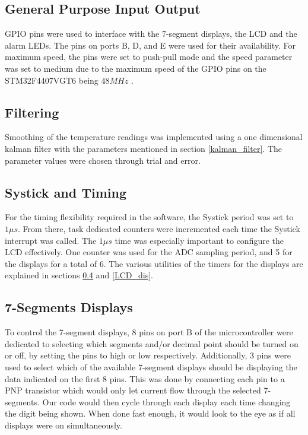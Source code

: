 \documentclass[12pt]{article}
\begin{document}
\subsection{General Purpose Input Output}
\FloatBarrier
GPIO pins were used to interface with the 7-segment displays, the LCD and the alarm LEDs. The pins on ports B, D, and E were used for their availability. For maximum speed, the pins were set to push-pull mode and the speed parameter was set to medium due to the maximum speed of the GPIO pins on the STM32F4407VGT6 being $48 MHz$ \cite{STM32F407xx}.

\subsection{Filtering}
Smoothing of the temperature readings was implemented using a one dimensional kalman filter with the parameters mentioned in section \ref{kalman_filter}. The parameter values were chosen through trial and error.

\subsection{Systick and Timing}
For the timing flexibility required in the software, the Systick period was set to $1\mu s$. From there, task dedicated counters were incremented each time the Systick interrupt was called. The $1\mu s$ time was especially important to configure the LCD effectively. One counter was used for the ADC sampling period, and 5 for the displays for a total of 6. The various utilities of the timers for the displays are explained in sections \ref{7seg_dis} and \ref{LCD_dis}.
\subsection{7-Segments Displays}
\label{7seg_dis}

To control the 7-segment displays, 8 pins on port B of the microcontroller were dedicated to selecting which segments and/or decimal point should be turned on or off, by setting the pins to high or low respectively. Additionally, 3 pins were used to select which of the available 7-segment displays should be displaying the data indicated on the first 8 pins. This was done by connecting each pin to a PNP transistor which would only let current flow through the selected 7-segments. Our code would then cycle through each display each time changing the digit being shown. When done fast enough, it would look to the eye as if all displays were on simultaneously.
\end{document}
